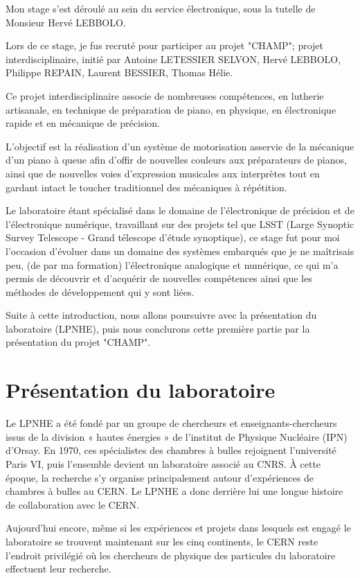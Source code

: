 \documentclass[french,a4paper,12pt]{report}
\begin{document}
Mon stage s'est déroulé au sein du service électronique, sous la tutelle de Monsieur Hervé LEBBOLO.

Lors de ce stage, je fus recruté pour participer au projet "CHAMP"; projet interdisciplinaire, initié par Antoine LETESSIER SELVON, Hervé LEBBOLO, Philippe REPAIN, Laurent BESSIER, Thomas Hélie.

Ce projet interdisciplinaire associe de nombreuses compétences, en lutherie artisanale, en technique de préparation de piano, en physique, en électronique rapide et en mécanique de précision.

L'objectif est la réalisation d'un système de motorisation asservie de la mécanique d'un piano à queue afin d'offir de nouvelles couleurs aux préparateurs de pianos, ainsi que de nouvelles voies d'expression musicales aux interprètes tout en gardant intact le toucher traditionnel des mécaniques à répétition.

Le laboratoire étant spécialisé dans le domaine de l'électronique de précision et de l'électronique numérique, travaillant sur des projets tel que LSST (Large Synoptic Survey Telescope - Grand télescope d'étude synoptique), ce stage fut pour moi l'occasion d'évoluer dans un domaine des systèmes embarqués que je ne maîtrisais peu, (de par ma formation) l'électronique analogique et numérique, ce qui m'a permis de découvrir et d'acquérir de nouvelles compétences ainsi que les méthodes de développement qui y sont liées.

Suite à cette introduction, nous allons poursuivre avec la présentation du laboratoire (LPNHE), puis nous conclurons cette première partie par la présentation du projet "CHAMP".


  
	\chapter{Présentation du laboratoire}
  Le LPNHE a été fondé par un groupe de chercheurs et enseignants-chercheurs issus de la division « hautes énergies » de l’institut de Physique Nucléaire (IPN) d’Orsay. En 1970, ces spécialistes des chambres à bulles rejoignent l’université Paris VI, puis l’ensemble devient un laboratoire associé au CNRS. À cette époque, la recherche s’y organise principalement autour d’expériences de chambres à bulles au CERN. Le LPNHE a donc derrière lui une longue histoire de collaboration avec le CERN.
  
  Aujourd’hui encore, même si les expériences et projets dans lesquels est engagé le laboratoire se trouvent maintenant sur les cinq continents, le CERN reste l’endroit privilégié où les chercheurs de physique des particules du laboratoire effectuent leur recherche.
  
\end{document}
